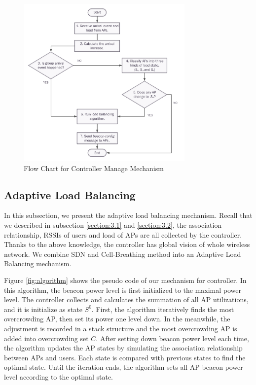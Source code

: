 \begin{figure}[tbp]
\begin{center}
\includegraphics[width=3.4in]{images/flowdiagram_trendindicator_controller.pdf}
\end{center}
\caption{ Flow Chart for Controller Manage Mechanism}
\label{fig:flowdiagram_trendindicator_controller}
\end{figure}

\subsection{Adaptive Load Balancing}
In this subsection, we present the adaptive load balancing mechanism. Recall that we described in subsection \ref{section:3.1} and \ref{section:3.2}, the association relationship, RSSIs of users and load of APs are all collected by the controller. Thanks to the above knowledge, the controller has global vision of whole wireless network. We combine SDN and Cell-Breathing method into an Adaptive Load Balancing mechanism.

 Figure \ref{fig:algorithm} shows the pseudo code of our mechanism for controller. In this algorithm, the beacon power level is first initialized to the maximal power level. The controller collects and calculates the summation of all AP utilizations, and it is initialize as state $S^0$. First, the algorithm iteratively finds the most overcrowding AP, then set its power one level down. In the meanwhile, the adjustment is recorded in a stack structure and the most overcrowding AP is added into overcrowding set $C$. After setting down beacon power level each time, the algorithm updates the AP states by simulating the association relationship between APs and users. Each state is compared with previous states to find the optimal state. Until the iteration ends, the algorithm sets all AP beacon power level according to the optimal state.

